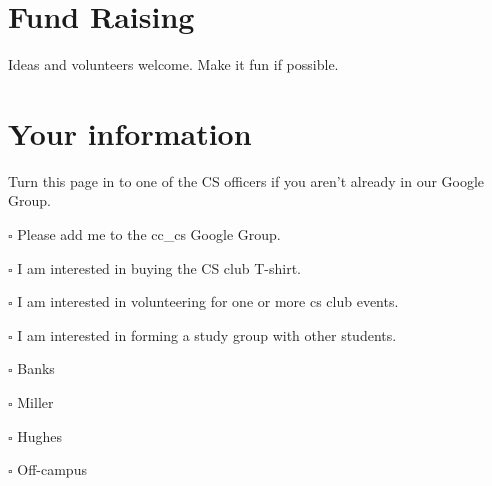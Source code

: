 \section{Fund Raising}
\label{sec:orgheadline14}

Ideas and volunteers welcome. Make it fun if possible.


\newpage


\section{Your information}
\label{sec:orgheadline15}

Turn this page in to one of the CS officers if you aren't already in our Google
Group.

\begin{description}
\item[{Name:}] 

\item[{Email:}] 

\item[{Major:}] 

\item[{Year in school:}] 

\item $\square$ Please add me to the cc\_cs Google Group.
\item $\square$ I am interested in buying the CS club T-shirt.
\item $\square$ I am interested in volunteering for one or more cs club events.
\item $\square$ I am interested in forming a study group with other students.
\item[{Dorm:}] 

\item $\square$ Banks
\item $\square$ Miller
\item $\square$ Hughes
\item $\square$ Off-campus
\end{description}




